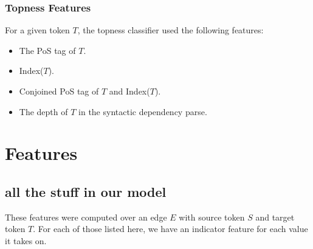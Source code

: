 \documentclass[11pt]{article}
\begin{document}
\subsubsection{Topness Features}
For a given token $T$, the topness classifier used the following features:
\begin{itemize}
\item The PoS tag of $T$.
\item Index($T$).
\item Conjoined PoS tag of $T$ and Index($T$).
\item The depth of $T$ in the syntactic dependency parse. 
\end{itemize}


\section{Features}

\subsection{all the stuff in our model}

\label{s:features}
These features were computed over an edge $E$ with source token $S$ and target token $T$.  For each of those listed here, we have an indicator feature for each value it takes on. 
\end{document}
